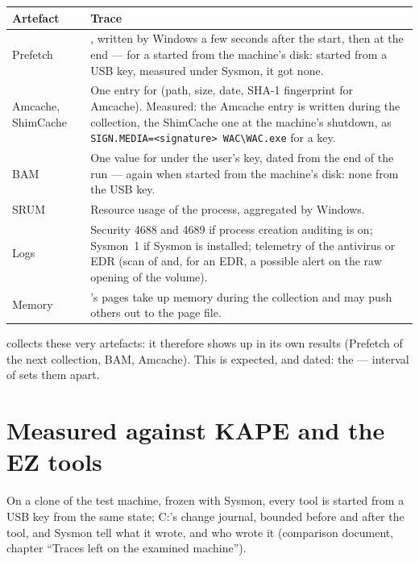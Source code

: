 \documentclass[11pt,a4paper,oneside]{report}
\begin{document}
\begin{longtable}{@{}L{4.3cm}L{10.1cm}@{}}
\toprule
\bfseries Artefact & \bfseries Trace \\
\midrule
\endhead
Prefetch & , written by Windows a few seconds after the start, then
  at the end --- for a  started from the machine's disk:
  started from a USB key, measured under Sysmon, it got none. \\
Amcache, ShimCache & One entry for  (path, size, date, SHA-1
  fingerprint for Amcache). Measured: the Amcache entry is written during the
  collection, the ShimCache one at the machine's shutdown, as
  \texttt{SIGN.MEDIA=<signature> WAC\textbackslash WAC.exe} for a key. \\
BAM & One value for  under the user's key, dated from the end
  of the run --- again when started from the machine's disk: none from the USB
  key. \\
SRUM & Resource usage of the process, aggregated by Windows. \\
Logs & Security 4688 and 4689 if process creation auditing is on; Sysmon~1 if
  Sysmon is installed; telemetry of the antivirus or EDR (scan of
   and, for an EDR, a possible alert on the raw opening of the
  volume). \\
Memory & \wac{}'s pages take up memory during the collection and may push
  others out to the page file. \\
\bottomrule
\end{longtable}

\begin{note}
\wac{} collects these very artefacts: it therefore shows up in its own results
(Prefetch of the next collection, BAM, Amcache). This is expected, and dated:
the  ---  interval of
 sets them apart.
\end{note}

\section{Measured against KAPE and the EZ tools}

On a clone of the test machine, frozen with Sysmon, every tool is started from
a USB key from the same state; C:'s change journal, bounded before and after
the tool, and Sysmon tell what it wrote, and who wrote it (comparison document,
chapter ``Traces left on the examined machine'').
\end{document}
